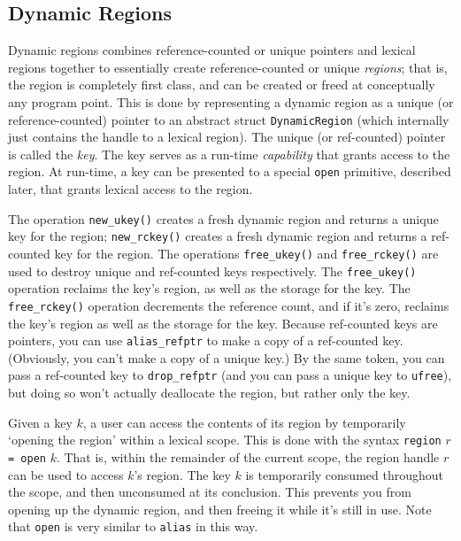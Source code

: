 \subsection{Dynamic Regions}

Dynamic regions combines reference-counted or unique pointers and lexical
regions together to essentially create reference-counted or unique
\emph{regions}; that is, the region is completely first class, and can be
created or freed at conceptually any program point.  This is done by
representing a dynamic region as a unique (or reference-counted) pointer to
an abstract struct \texttt{DynamicRegion} (which internally just contains
the handle to a lexical region).  The unique (or ref-counted) pointer is
called the \emph{key}.  The key serves as a run-time \emph{capability} that
grants access to the region.  At run-time, a key can be presented to a
special \texttt{open} primitive, described later, that grants lexical access
to the region.
        
The operation \texttt{new\_ukey()} creates a fresh dynamic region and returns
a unique key for the region; \texttt{new\_rckey()} creates a fresh dynamic
region and returns a ref-counted key for the region.  The operations
\texttt{free\_ukey()} and \texttt{free\_rckey()} are used to destroy unique
and ref-counted keys respectively.  The \texttt{free\_ukey()} operation
reclaims the key's region, as well as the storage for the key.  The
\texttt{free\_rckey()} operation decrements the reference count, and if it's
zero, reclaims the key's region as well as the storage for the key.  Because
ref-counted keys are pointers, you can use \texttt{alias\_refptr} to make a
copy of a ref-counted key.  (Obviously, you can't make a copy of a unique
key.)  By the same token, you can pass a ref-counted key to
\texttt{drop\_refptr} (and you can pass a unique key to \texttt{ufree}), but
doing so won't actually deallocate the region, but rather only the key.

Given a key $k$, a user can access the contents of its region by temporarily
`opening the region' within a lexical scope.  This is done with the syntax
\verb+region+ $r$ \verb+= open+ $k$.  That is, within the remainder of the
current scope, the region handle $r$ can be used to access $k$'s region.
The key $k$ is temporarily consumed throughout the scope, and then
unconsumed at its conclusion.  This prevents you from opening up the dynamic
region, and then freeing it while it's still in use.  Note that
\texttt{open} is very similar to \texttt{alias} in this way.

